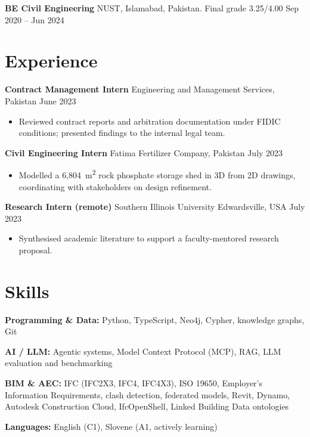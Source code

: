 \documentclass[a4paper,10.5pt]{article}
\newcommand{\datefill}{\dotfill}
\newcommand{\entry}[3]{\vspace{2.5pt}\noindent\textbf{#1} \textbar{} #2 \datefill{} #3\par\vspace{0.5pt}}
\newcommand{\skillrow}[2]{\noindent\textbf{#1:} #2\par\vspace{1pt}}
\begin{document}
\entry{BE Civil Engineering}{NUST, Islamabad, Pakistan. Final grade 3.25/4.00}{Sep 2020 -- Jun 2024}

\section{Experience}
\entry{Contract Management Intern}{Engineering and Management Services, Pakistan}{June 2023}
\begin{itemize}
  \item Reviewed contract reports and arbitration documentation under FIDIC
        conditions; presented findings to the internal legal team.
\end{itemize}

\entry{Civil Engineering Intern}{Fatima Fertilizer Company, Pakistan}{July 2023}
\begin{itemize}
  \item Modelled a 6,804~m\textsuperscript{2} rock phosphate storage shed in 3D from
        2D drawings, coordinating with stakeholders on design refinement.
\end{itemize}

\entry{Research Intern (remote)}{Southern Illinois University Edwardsville, USA}{July 2023}
\begin{itemize}
  \item Synthesised academic literature to support a faculty-mentored research proposal.
\end{itemize}

\section{Skills}

\skillrow{Programming \& Data}{Python, TypeScript, Neo4j, Cypher, knowledge graphs, Git}
\skillrow{AI / LLM}{Agentic systems, Model Context Protocol (MCP), RAG, LLM evaluation and benchmarking}
\skillrow{BIM \& AEC}{IFC (IFC2X3, IFC4, IFC4X3), ISO 19650, Employer's Information Requirements, clash detection, federated models, Revit, Dynamo, Autodesk Construction Cloud, IfcOpenShell, Linked Building Data ontologies}

\skillrow{Languages}{English (C1), Slovene (A1, actively learning)}
\end{document}
